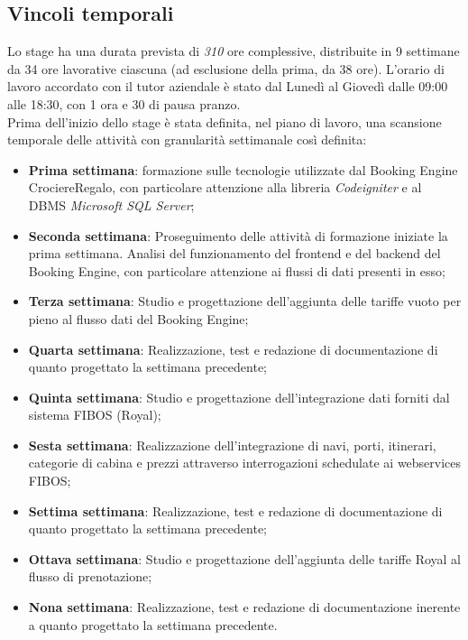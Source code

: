 \subsection{Vincoli temporali}
Lo stage ha una durata prevista di \textit{310} ore complessive, distribuite in 9 settimane da 34 ore lavorative ciascuna (ad esclusione della prima, da 38 ore). L'orario di lavoro accordato con il tutor aziendale è stato dal Lunedì al Giovedì dalle 09:00 alle 18:30, con 1 ora e 30 di pausa pranzo. \\
Prima dell'inizio dello stage è stata definita, nel piano di lavoro, una scansione temporale delle attività con granularità settimanale così definita:
\begin{itemize}
	\item \textbf{Prima settimana}: formazione sulle tecnologie utilizzate dal Booking Engine CrociereRegalo, con particolare attenzione alla libreria \textit{Codeigniter} e al DBMS \textit{Microsoft SQL Server};
	\item \textbf{Seconda settimana}: Proseguimento delle attività di formazione iniziate la prima settimana. Analisi del funzionamento del frontend e del backend del Booking Engine, con particolare attenzione ai flussi di dati presenti in esso;
	\item \textbf{Terza settimana}: Studio e progettazione dell'aggiunta delle tariffe vuoto per pieno al flusso dati del Booking Engine;
	\item \textbf{Quarta settimana}: Realizzazione, test e redazione di documentazione di quanto progettato la settimana precedente;
	\item \textbf{Quinta settimana}: Studio e progettazione dell'integrazione dati forniti dal sistema FIBOS (Royal);
	\item \textbf{Sesta settimana}: Realizzazione dell'integrazione di navi, porti, itinerari, categorie di cabina e prezzi attraverso interrogazioni schedulate ai \glspl{webservice} FIBOS;
	\item \textbf{Settima settimana}: Realizzazione, test e redazione di documentazione di quanto progettato la settimana precedente;
	\item \textbf{Ottava settimana}: Studio e progettazione dell'aggiunta delle tariffe Royal al flusso di prenotazione;
	\item \textbf{Nona settimana}: Realizzazione, test e redazione di documentazione inerente a quanto progettato la settimana precedente.
\end{itemize}

